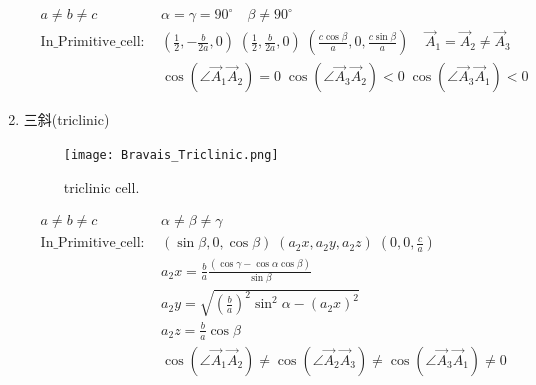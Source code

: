 \documentclass{article}      %
\begin{document}
\begin{enumerate}
\begin{displaymath}
	\begin{aligned}
		&a\neq b\neq c &\alpha=\gamma=90^{\circ}\quad\beta\neq90^{\circ} \\
		&\mathrm{In\_Primitive\_cell}:~&(\frac12,-\frac{b}{2a},0)\;(\frac12,\frac{b}{2a},0)\;(\frac{c\cos\beta}{a},0,\frac{c\sin\beta}{a})\;\;\;\;\vec A_1=\vec A_2\neq\vec A_3\\
		& &\cos(\angle\vec A_1\vec A_2)=0\;\cos(\angle\vec A_3\vec A_2)<0\;\cos(\angle\vec A_3\vec A_1)<0
	\end{aligned}
\end{displaymath}
		\item 三斜(\textrm{triclinic})
\begin{figure}[h!]
\centering
\texttt{[image: Bravais\_Triclinic.png]}
\caption{\small triclinic cell.}%
\label{Bravais:triclinic}
\end{figure}
\begin{displaymath}
	\begin{aligned}
	& a\neq b\neq c &\alpha\neq\beta\neq\gamma\\
	&\mathrm{In\_Primitive\_cell}:~&(\sin\beta,0,\cos\beta)\;(a_2x,a_2y,a_2z)\;(0,0,\frac{c}{a})\\
	& &a_2x=\frac{b}{a}\frac{(\cos\gamma-\cos\alpha\cos\beta)}{\sin\beta}\\
	& &a_2y=\sqrt{\left( \frac{b}{a} \right)^2\sin^2\alpha-(a_2x)^2}\\
	& &a_2z=\frac{b}{a}\cos\beta \\
		& &\cos(\angle\vec A_1\vec A_2)\neq\cos(\angle\vec A_2\vec A_3)\neq\cos(\angle\vec A_3\vec A_1)\neq0
	\end{aligned}
\end{displaymath}
\end{enumerate}
\end{document}
